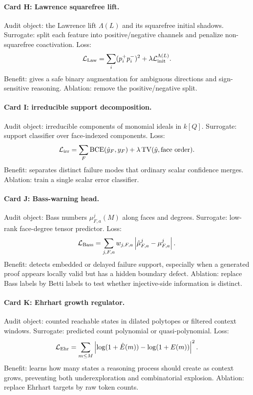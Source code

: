 \documentclass[11pt]{article}
\theoremstyle{definition}
\begin{document}
\paragraph{Card H: Lawrence squarefree lift.}
Audit object: the Lawrence lift \(\Lambda(L)\) and its squarefree initial shadows.  Surrogate: split each feature into positive/negative channels and penalize non-squarefree coactivation.  Loss:
\[
 \mathcal L_{\rm Law}=\sum_i (p_i^+p_i^-)^2+\lambda\mathcal L_{\rm init}^{\Lambda(L)}.
\]
Benefit: gives a safe binary augmentation for ambiguous directions and sign-sensitive reasoning.  Ablation: remove the positive/negative split.

\paragraph{Card I: irreducible support decomposition.}
Audit object: irreducible components of monomial ideals in \(k[Q]\).  Surrogate: support classifier over face-indexed components.  Loss:
\[
\mathcal L_{\rm irr}=\sum_F \mathrm{BCE}(\hat y_F,y_F)+\lambda\,\mathrm{TV}(\hat y,\text{face order}).
\]
Benefit: separates distinct failure modes that ordinary scalar confidence merges.  Ablation: train a single scalar error classifier.

\paragraph{Card J: Bass-warning head.}
Audit object: Bass numbers \(\mu^j_{F,a}(M)\) along faces and degrees.  Surrogate: low-rank face-degree tensor predictor.  Loss:
\[
\mathcal L_{\rm Bass}=\sum_{j,F,a}w_{j,F,a}\left|\hat\mu^j_{F,a}-\mu^j_{F,a}\right|.
\]
Benefit: detects embedded or delayed failure support, especially when a generated proof appears locally valid but has a hidden boundary defect.  Ablation: replace Bass labels by Betti labels to test whether injective-side information is distinct.

\paragraph{Card K: Ehrhart growth regulator.}
Audit object: counted reachable states in dilated polytopes or filtered context windows.  Surrogate: predicted count polynomial or quasi-polynomial.  Loss:
\[
\mathcal L_{\rm Ehr}=\sum_{m\le M}\left|\log(1+\hat E(m))-\log(1+E(m))\right|^2.
\]
Benefit: learns how many states a reasoning process should create as context grows, preventing both underexploration and combinatorial explosion.  Ablation: replace Ehrhart targets by raw token counts.
\end{document}
